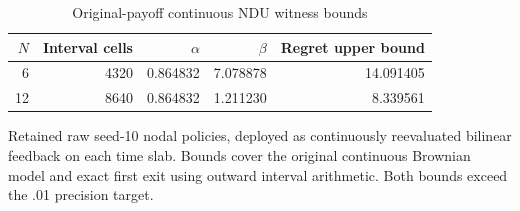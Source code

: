 \begin{table}[htbp]
\centering\small
\caption{Original-payoff continuous NDU witness bounds}\label{r8:tab:continuum}
\begin{tabular}{@{}rrrrr@{}}
\toprule
$N$ & Interval cells & $\alpha$ & $\beta$ & Regret upper bound \\
\midrule
6 & 4320 & 0.864832 & 7.078878 & 14.091405 \\
12 & 8640 & 0.864832 & 1.211230 & 8.339561 \\
\bottomrule
\end{tabular}
\par\smallskip\footnotesize Retained raw seed-10 nodal policies, deployed as continuously reevaluated bilinear feedback on each time slab. Bounds cover the original continuous Brownian model and exact first exit using outward interval arithmetic. Both bounds exceed the .01 precision target.
\end{table}
